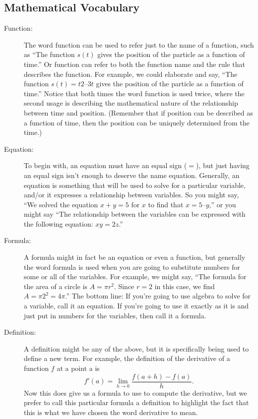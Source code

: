 \subsection{Mathematical Vocabulary}
\begin{description}
    \item[Function:] The word function can be used to refer just to the name of a
        function, such as  ``The function $s(t)$ gives the position of the particle as a
        function of time.'' Or function can refer to both the function name and the rule
        that describes the function. For example, we could elaborate and say, ``The
        function $s(t) = t2 – 3t$ gives the position of the particle as a function of
        time.'' Notice that both times the word function is used twice, where the second
        usage is describing the mathematical nature of the relationship between time and
        position. (Remember that if position can be described as a function of time, then
        the position can be uniquely determined from the time.)
    \item[Equation:] To begin with, an equation must have an equal sign ($=$), but just
        having an equal sign isn't enough to deserve the name equation. Generally, an
        equation is something that will be used to solve for a particular variable, and/or
        it expresses a relationship between variables. So you might say, ``We solved the
        equation $x + y = 5$ for $x$ to find that $x = 5 – y$,'' or you might say ``The
        relationship between the variables can be expressed with the following equation:
        $xy = 2z$.''

    \item[Formula:] A formula might in fact be an equation or even a function, but
        generally the word formula is used when you are going to substitute numbers for
        some or all of the variables.  For example, we might say, ``The formula for the
        area of a circle is $A = \pi r^2$.  Since $r = 2$ in this case, we find $A = \pi
        2^2 = 4\pi$.''  The bottom line: If you're going to use algebra to solve for a
        variable, call it an equation. If you’re going to use it exactly as it is and just
        put in numbers for the variables, then call it a formula.

    \item[Definition:] A definition might be any of the above, but it is specifically
        being used to define a new term. For example, the definition of the derivative of
        a function $f$ at a point a is  
        \[ f'(a) = \lim_{h \to 0} \frac{f(a+h)-f(a)}{h}. \]
        Now this does give us a formula to use to compute the derivative, but we prefer to
        call this particular formula a definition to highlight the fact that this is what
        we have chosen the word derivative to mean.


\end{description}
